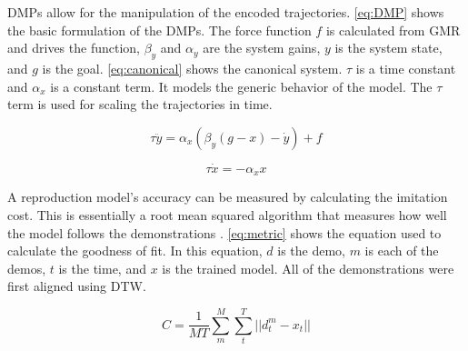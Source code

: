 DMPs allow for the manipulation of the encoded trajectories. \autoref{eq:DMP} shows the basic formulation of the DMPs. The force function $f$ is calculated from GMR and drives the function, $\beta_y$ and $\alpha_y$ are the system gains, $y$ is the system state, and $g$ is the goal. \autoref{eq:canonical} shows the canonical system. $\tau$ is a time constant and $\alpha_x$ is a constant term. It models the generic behavior of the model. The $\tau$ term is used for scaling the trajectories in time.  


\begin{equation}
    \tau \ddot{y} = \alpha_x (\beta_y(g-x)-\dot{y}) + f  
    \label{eq:DMP} 
\end{equation}


\begin{equation}
    \tau \dot{x} = -\alpha_x x  
    \label{eq:canonical} 
\end{equation}



A reproduction model's accuracy can be measured by calculating the imitation cost. This is essentially a root mean squared algorithm that measures how well the model follows the demonstrations \cite{metric}. \autoref{eq:metric} shows the equation used to calculate the goodness of fit. In this equation, $d$ is the demo, $m$ is each of the demos, $t$ is the time, and $x$ is the trained model. All of the demonstrations were first aligned using DTW.

   \begin{equation}
        C = \frac{1}{MT} \sum_m^M{\sum_t^T{ || d^m_t - x_t||}}
        \label{eq:metric}
    \end{equation}



